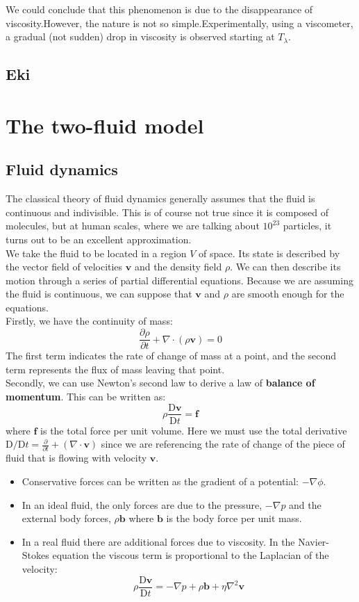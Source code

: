 \documentclass{article}
\begin{document}
We could conclude that this phenomenon is due to the disappearance of viscosity.However, the nature is not so simple.Experimentally, using a viscometer, a gradual (not sudden) drop in viscosity is observed starting at $T_\lambda$.
\\

\subsection{Eki}

\section{The two-fluid model}

\subsection{Fluid dynamics}
The classical theory of fluid dynamics generally assumes that the fluid is
continuous and indivisible.  This is of course not true since it is composed
of molecules, but at human scales, where we are talking about $10^{23}$
particles, it turns out to be an excellent approximation.
\\

We take the fluid to be located in a region $V$ of space.  Its state is
described by the vector field of velocities $\mathbf{v}$ and the density
field $\rho$.  We can then describe its motion through a series of partial
differential equations.  Because we are assuming the fluid is continuous, we
can suppose that $\mathbf{v}$ and $\rho$ are smooth enough for the equations.
\\

Firstly, we have the continuity of mass:
\[\frac{\partial\rho}{\partial t} + \nabla\cdot(\rho\mathbf{v}) = 0\]
The first term indicates the rate of change of mass at a point, and the second
term represents the flux of mass leaving that point.
\\

Secondly, we can use Newton's second law to derive a law of
\textbf{balance of momentum}.	This can be written as:
\[\rho\frac{\mathrm{D}\mathbf{v}}{\mathrm{D} t}= \mathbf{f}\]
where $\mathbf{f}$ is the total force per unit volume.	Here we must use the
total derivative
$\mathrm{D}/\mathrm{D}t = \frac{\partial}{\partial t} + (\nabla \cdot
    \mathbf{v})$
since we are referencing the rate of change of the piece of fluid that is
flowing with velocity $\mathbf{v}$.
\begin{itemize}
    \item Conservative forces can be written as the gradient of a potential: $-\nabla\phi$.
    \item In an ideal fluid, the only forces are due to the pressure, $-\nabla p$ and the external body forces, $\rho \mathbf{b}$ where $\mathbf{b}$ is the body force per unit mass.
    \item In a real fluid there are additional forces due to viscosity. In the Navier-Stokes equation the viscous term is proportional to the Laplacian of the velocity:
\[\rho\frac{\mathrm{D}\mathbf{v}}{\mathrm{D} t}=-\nabla p + \rho \mathbf{b} +
    \eta\nabla^2{\mathbf{v}}\]
\end{itemize}
\end{document}
